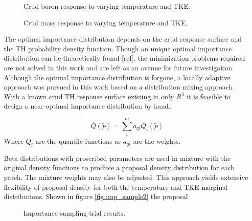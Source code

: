 \begin{figure}[H]%
    \centering
    \qquad
    \caption[]{Crud boron response to varying temperature and TKE.}%
    \label{fig:crud_sensi2}%
\end{figure}

\begin{figure}[H]%
    \centering
    \qquad
    \caption[]{Crud mass response to varying temperature and TKE.}%
    \label{fig:crud_sensi3}%
\end{figure}


The optimal importance distribution depends on the crud response surface and the TH probability density function.  Though an unique optimal importance distribution can be theoretically found [ref], the minimization problems required are not solved in this work and are left as an avenue for future investigation.
Although the optimal importance distribution is forgone, a locally adaptive approach was pursued in this work based on a distribution mixing approach.  With a known crud TH response surface existing in only $R^3$ it is feasible to design a near-optimal importance distribution by hand.

\begin{equation}
Q(\tilde{p}) = \sum_i^m a_{qi} Q_i(\tilde{p})
\end{equation}
Where $Q_i$ are the quantile functions as $a_{qi}$ are the weights.

Beta distributions with proscribed parameters are used in mixture with the original density functions to produce a proposal density distribution for each patch.  The mixture weights may also be adjusted.  This approach yields extensive flexibility of proposal density for both the temperature and TKE marginal distributions.  Shown in figure \ref{fig:imp_sample2} the proposal


\begin{figure}[H]%
    \centering
    \qquad
    \caption[]{Importance sampling trial results.}%
    \label{fig:imp_sample1}%
\end{figure}

